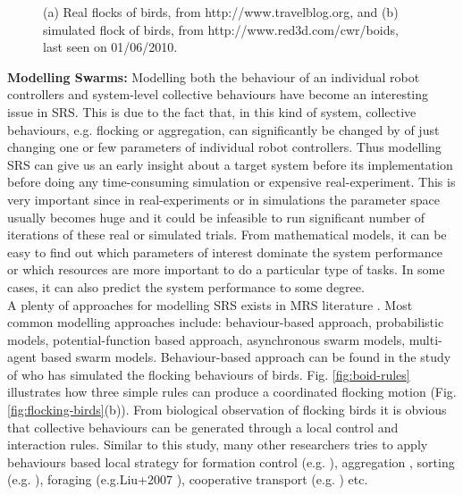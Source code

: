 \begin{figure}
\centering
{} 
\hspace{0.25cm}
\caption{ (a) Real flocks of birds, from http://www.travelblog.org, and (b) simulated flock of birds, from http://www.red3d.com/cwr/boids, last seen on 01/06/2010.}
\label{fig:birds-flocking}
\end{figure}
\textbf{Modelling Swarms:} 
Modelling both the behaviour of an individual robot controllers and system-level collective behaviours have become an interesting issue in SRS. This is due to the fact that, in this kind of system, collective behaviours, e.g. flocking or aggregation, can significantly be changed by of just changing one or few parameters of individual robot controllers. Thus modelling SRS can give us an early insight about a target system before its implementation before doing any time-consuming simulation or expensive real-experiment. This is very important since in real-experiments or in simulations the parameter space usually becomes huge and it could be infeasible to run significant number of iterations of these real or simulated trials. From mathematical models, it can be easy to find out which parameters of interest dominate the system performance or which resources are more important to do a particular type of tasks. In some cases, it can also predict the system performance to some degree. \\
A plenty of approaches for modelling SRS exists in MRS literature \cite{Gazi+2006}. Most common modelling approaches include: behaviour-based approach, probabilistic models, potential-function based approach, asynchronous swarm models, multi-agent based swarm models. Behaviour-based approach can be found in the study of  who has simulated the flocking behaviours of birds. Fig. \ref{fig:boid-rules} illustrates how three simple rules can produce a coordinated flocking motion (Fig. \ref{fig:flocking-birds}(b)). From biological observation of flocking birds  it is obvious that collective behaviours can be generated through a local control and interaction rules. Similar to this study, many other researchers tries to apply behaviours based local strategy for formation control (e.g. \cite{Balch+1998}), aggregation , sorting (e.g. \cite{Melhuish+1998}), foraging (e.g.Liu+2007 ), cooperative transport (e.g. \cite{Kube1997}) etc.\\
